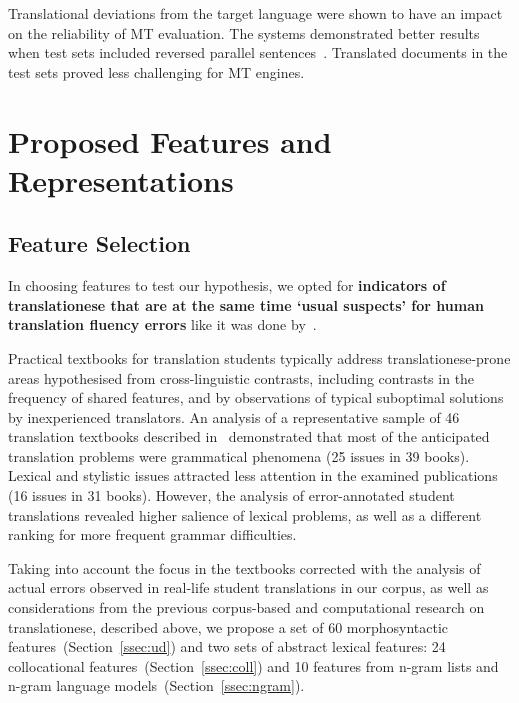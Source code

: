 Translational deviations from the target language were shown to have an impact on the reliability of MT evaluation. The systems demonstrated better results when test sets included reversed parallel sentences~\citep{Zhang2019, Graham2020}. Translated documents in the test sets proved less challenging for MT engines.


\section{\label{sec:myfeats}Proposed Features and Representations}

\subsection{\label{ssec:select}Feature Selection}
In choosing features to test our hypothesis, we opted for \textbf{indicators of translationese that are at the same time `usual suspects' for human translation fluency errors} like it was done by~\citet{Rabadan2009}.

Practical textbooks for translation students typically address translationese-prone areas hypothesised from cross-linguistic contrasts, including contrasts in the frequency of shared features, and by observations of typical suboptimal solutions by inexperienced translators. 
An analysis of a representative sample of 46 translation textbooks described in~\citet[see Table 4]{Kunilovskaya2023err} demonstrated that most of the anticipated translation problems were grammatical phenomena (25 issues in 39 books). Lexical and stylistic issues attracted less attention in the examined publications (16 issues in 31 books). However, the analysis of error-annotated student translations revealed higher salience of lexical problems, as well as a different ranking for more frequent grammar difficulties. 

Taking into account the focus in the textbooks corrected with the analysis of actual errors observed in real-life student translations in our corpus, as well as considerations from the previous corpus-based and computational research on translationese, described above, we propose a set of 60 morphosyntactic features~(Section~\ref{ssec:ud}) and two sets of abstract lexical features: 24 collocational features~(Section~\ref{ssec:coll}) and 10 features from n-gram lists and n-gram language models~(Section~\ref{ssec:ngram}).

